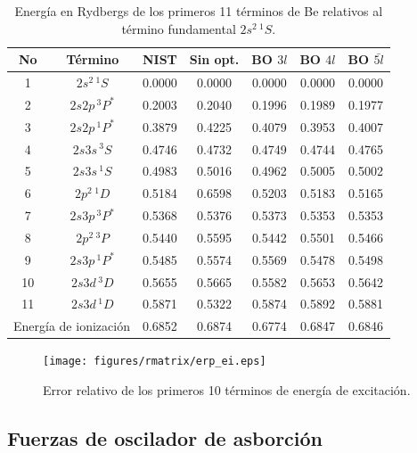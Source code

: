 \begin{table}
\centering
\begin{tabular}{|cc|ccccc|}
\hline 
No & Término      & NIST & Sin opt. & BO $3l$ & BO $4l$ & BO $\bar{5l}$ \\
\hline 
\hline 
1 & $2s^2\,^1S$   & 0.0000 & 0.0000 & 0.0000 & 0.0000 & 0.0000 \\
2 & $2s2p\,^3P^*$ & 0.2003 & 0.2040 & 0.1996 & 0.1989 & 0.1977 \\
3 & $2s2p\,^1P^*$ & 0.3879 & 0.4225 & 0.4079 & 0.3953 & 0.4007 \\
4 & $2s3s\,^3S$   & 0.4746 & 0.4732 & 0.4749 & 0.4744 & 0.4765 \\
5 & $2s3s\,^1S$   & 0.4983 & 0.5016 & 0.4962 & 0.5005 & 0.5002 \\
6 & $2p^2\,^1D$   & 0.5184 & 0.6598 & 0.5203 & 0.5183 & 0.5165 \\
7 & $2s3p\,^3P^*$ & 0.5368 & 0.5376 & 0.5373 & 0.5353 & 0.5353 \\
8 & $2p^2\,^3P$   & 0.5440 & 0.5595 & 0.5442 & 0.5501 & 0.5466 \\
9 & $2s3p\,^1P^*$ & 0.5485 & 0.5574 & 0.5569 & 0.5478 & 0.5498 \\
10 & $2s3d\,^3D$  & 0.5655 & 0.5665 & 0.5582 & 0.5653 & 0.5642 \\
11 & $2s3d\,^1D$  & 0.5871 & 0.5322 & 0.5874 & 0.5892 & 0.5881 \\
\hline
\multicolumn{2}{l}{Energía de ionización} & 0.6852 & 0.6874 & 0.6774 & 0.6847 & 0.6846  \\ 
\hline
\end{tabular}
\caption[Energías de excitación de Be.]
{Energía en Rydbergs de los primeros 11 términos de Be relativos 
al término fundamental $2s^2\,^1S$.}
\label{tab:exener}
\end{table}

\begin{figure}
\centering
\texttt{[image: figures/rmatrix/erp\_ei.eps]} 
\caption[Error relativo de los primeros 10 términos de excitación.]
{Error relativo de los primeros 10 términos de energía de excitación.}
\label{fig:exener}
\end{figure}

\newpage
\subsection{Fuerzas de oscilador de asborción}


